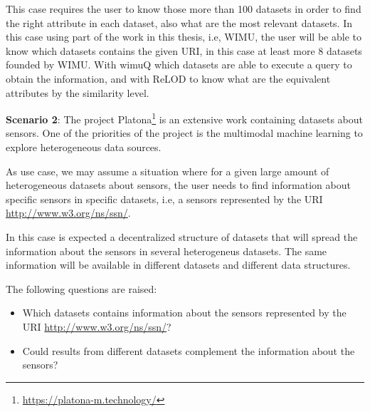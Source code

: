 This case requires the user to know those more than 100 datasets in order to find the right attribute in each dataset, also what are the most relevant datasets. In this case using part of the work in this thesis, i.e, WIMU\cite{valdestilhas2018my}, the user will be able to know which datasets contains the given URI, in this case at least more 8 datasets founded by WIMU. With wimuQ\cite{ValdestilhasKcap} which datasets are able to execute a query to obtain the information, and with ReLOD\cite{valdestilhasSWJ2020} to know what are the equivalent attributes by the similarity level.


\textbf{Scenario 2}: The project Platona\footnote{\url{https://platona-m.technology/}} is an extensive work containing datasets about sensors. One of the priorities of the project is the multimodal machine learning to explore heterogeneous data sources.

As use case, we may assume a situation where for a given large amount of heterogeneous datasets about sensors, the user needs to find information about specific sensors in specific datasets, i.e, a sensors represented by the URI \url{http://www.w3.org/ns/ssn/}.

In this case is expected a decentralized structure of datasets that will spread the information about the sensors in several heterogeneus datasets. The same information will be available in different datasets and different data structures.

The following questions are raised:
\begin{itemize}
    \item Which datasets contains information about the sensors represented by the URI \url{http://www.w3.org/ns/ssn/}?
    \item Could results from different datasets complement the information about the sensors?
\end{itemize}

